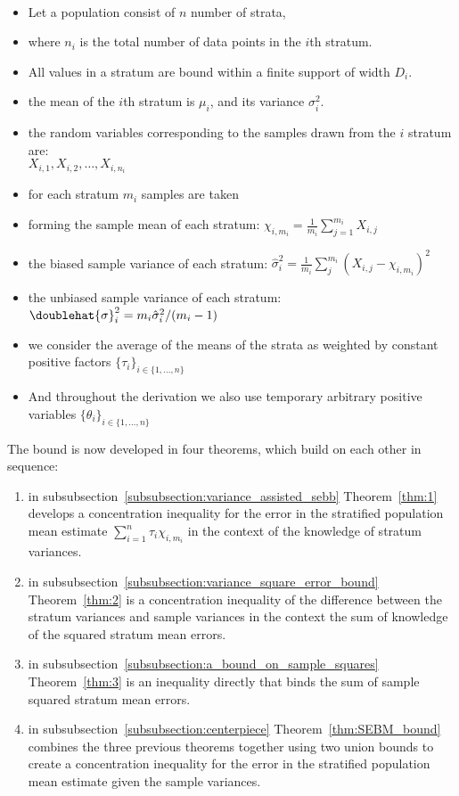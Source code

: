 \begin{definition}\label{def:ProblemContext}\hspace{1cm}\\
\begin{itemize}
    \item Let a population consist of $n$ number of strata,
    \item where $n_i$ is the total number of data points in the $i$th stratum.
    \item All values in a stratum are bound within a finite support of width $D_i$.
    \item the mean of the $i$th stratum is $\mu_i$, and its variance $\sigma_i^2$.
    \item the random variables corresponding to the samples drawn from the $i$ stratum are:\\ $X_{i,1},X_{i,2},\dots,X_{i,n_i}$
    \item for each stratum $m_i$ samples are taken
    \item forming the sample mean of each stratum: $\chi_{i,m_i}= \frac{1}{m_i}\sum_{j=1}^{m_i}X_{i,j}$
    \item the biased sample variance of each stratum: $\hat{\sigma}_i^2=\frac{1}{m_i}\sum_j^{m_i}(X_{i,j}-\chi_{i,m_i})^2$
    \item the unbiased sample variance of each stratum: $\doublehat{\sigma}_i^2 = m_i\hat{\sigma}_i^2/(m_i-1)$
    \item we consider the average of the means of the strata as weighted by constant positive factors $\{\tau_i \}_{i\in \{1,\dots,n\}}$
    \item And throughout the derivation we also use temporary arbitrary positive variables $\{\theta_i \}_{i\in \{1,\dots,n\}}$
\end{itemize}
\end{definition}


\noindent The bound is now developed in four theorems, which build on each other in sequence:
\begin{enumerate}
    \item in subsubsection~\ref{subsubsection:variance_assisted_sebb} Theorem~\ref{thm:1} develops a concentration inequality for the error in the stratified population mean estimate $\sum_{i=1}^n\tau_i\chi_{i,m_i}$ in the context of the knowledge of stratum variances.
    \item in subsubsection~\ref{subsubsection:variance_square_error_bound} Theorem~\ref{thm:2} is a concentration inequality of the difference between the stratum variances and sample variances in the context the sum of knowledge of the squared stratum mean errors.
    \item in subsubsection~\ref{subsubsection:a_bound_on_sample_squares} Theorem~\ref{thm:3} is an inequality directly that binds the sum of sample squared stratum mean errors.
    \item in subsubsection~\ref{subsubsection:centerpiece} Theorem~\ref{thm:SEBM_bound} combines the three previous theorems together using two union bounds to create a concentration inequality for the error in the stratified population mean estimate given the sample variances.
\end{enumerate}


